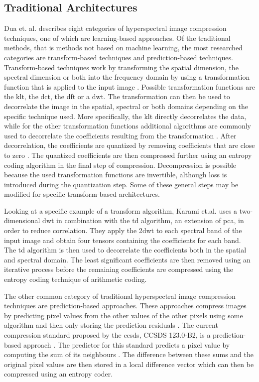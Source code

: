 \subsection{Traditional Architectures}
Dua et. al. \citep{dua_comprehensive_2020} describes eight categories of hyperspectral image compression techniques, one of which are learning-based approaches. Of the traditional methods, that is methods not based on machine learning, the most researched categories are transform-based techniques and prediction-based techniques. Transform-based techniques work by transforming the spatial dimension, the spectral dimension or both into the frequency domain by using a transformation function that is applied to the input image \citep{dua_comprehensive_2020}. Possible transformation functions are the \ac{klt}, the \ac{dct}, the \ac{dft} or a \ac{dwt}. The transformation can then be used to decorrelate the image in the spatial, spectral or both domains depending on the specific technique used. More specifically, the \ac{klt} directly decorrelates the data, while for the other transformation functions additional algorithms are commonly used to decorrelate the coefficients resulting from the transformation \citep{saghri_adaptive_2010}\citep{karami_compression_2012}. After decorrelation, the coefficients are quantized by removing coefficients that are close to zero \citep{dua_comprehensive_2020}. The quantized coefficients are then compressed further using an entropy coding algorithm in the final step of compression. Decompression is possible because the used transformation functions are invertible, although loss is introduced during the quantization step. Some of these general steps may be modified for specific transform-based architectures.

Looking at a specific example of a transform algorithm, Karami et.al. \citep{karami_compression_2012} uses a two-dimensional \ac{dwt} in combination with the \ac{td} algorithm, an extension of \ac{pca}, in order to reduce correlation. They apply the 2\ac{dwt} to each spectral band of the input image and obtain four tensors containing the coefficients for each band. The \ac{td} algorithm is then used to decorrelate the coefficients both in the spatial and spectral domain. The least significant coefficients are then removed using an iterative process before the remaining coefficients are compressed using the entropy coding technique of arithmetic coding.

The other common category of traditional hyperspectral image compression techniques are prediction-based approaches. These approaches compress images by predicting pixel values from the other values of the other pixels using some algorithm and then only storing the prediction residuals \citep{dua_comprehensive_2020}\citep{conoscenti_constant_2016}. The current compression standard proposed by the \ac{ccsds}, CCSDS 123.0-B2, is a prediction-based approach \citep{hernandez-cabronero_ccsds_2021}. The predictor for this standard predicts a pixel value by computing the sum of its neighbours \citep{conoscenti_constant_2016}. The difference between these sums and the original pixel values are then stored in a local difference vector which can then be compressed using an entropy coder.
